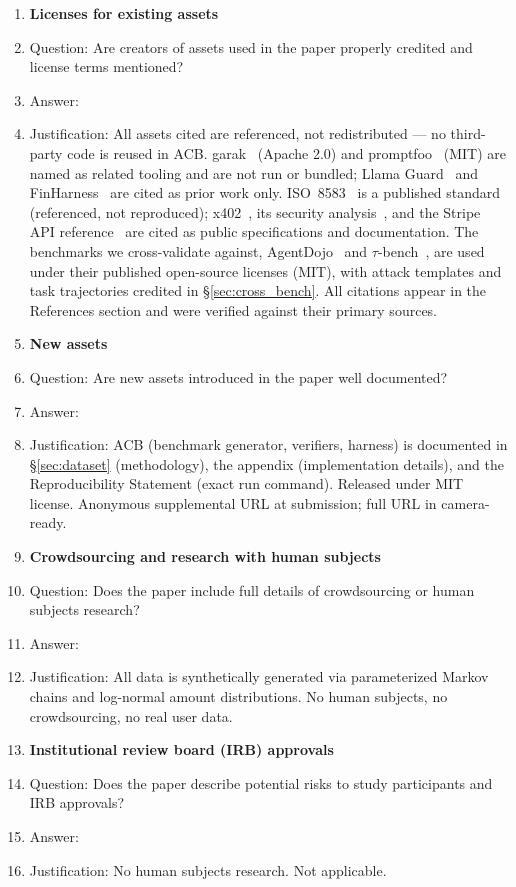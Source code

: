 \begin{enumerate}
\item {\bf Licenses for existing assets}
    \item[] Question: Are creators of assets used in the paper properly credited and license terms mentioned?
    \item[] Answer: \answerYes{}
    \item[] Justification: All assets cited are referenced, not redistributed --- no third-party code is reused in ACB. garak~\cite{garak} (Apache 2.0) and promptfoo~\cite{promptfoo} (MIT) are named as related tooling and are not run or bundled; Llama Guard~\cite{llamaguard} and FinHarness~\cite{finharness} are cited as prior work only. ISO~8583~\cite{iso8583} is a published standard (referenced, not reproduced); x402~\cite{x402}, its security analysis~\cite{x402attacks}, and the Stripe API reference~\cite{stripe} are cited as public specifications and documentation. The benchmarks we cross-validate against, AgentDojo~\cite{agentdojo} and $\tau$-bench~\cite{taubench}, are used under their published open-source licenses (MIT), with attack templates and task trajectories credited in \S\ref{sec:cross_bench}. All citations appear in the References section and were verified against their primary sources.

\item {\bf New assets}
    \item[] Question: Are new assets introduced in the paper well documented?
    \item[] Answer: \answerYes{}
    \item[] Justification: ACB (benchmark generator, verifiers, harness) is documented in \S\ref{sec:dataset} (methodology), the appendix (implementation details), and the Reproducibility Statement (exact run command). Released under MIT license. Anonymous supplemental URL at submission; full URL in camera-ready.

\item {\bf Crowdsourcing and research with human subjects}
    \item[] Question: Does the paper include full details of crowdsourcing or human subjects research?
    \item[] Answer: \answerNA{}
    \item[] Justification: All data is synthetically generated via parameterized Markov chains and log-normal amount distributions. No human subjects, no crowdsourcing, no real user data.

\item {\bf Institutional review board (IRB) approvals}
    \item[] Question: Does the paper describe potential risks to study participants and IRB approvals?
    \item[] Answer: \answerNA{}
    \item[] Justification: No human subjects research. Not applicable.


\end{enumerate}
